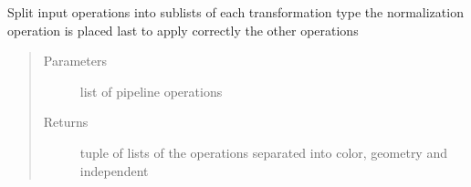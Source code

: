 \documentclass[letterpaper,10pt,english]{sphinxmanual}
\begin{document}

\begin{fulllineitems}
\label{\detokenize{ida_lib.core:ida_lib.core.pipeline_functional.split_operations_by_type}}
Split input operations into sub\sphinxhyphen{}lists of each transformation type
the normalization operation is placed last to apply correctly the other operations
\begin{quote}\begin{description}
\item[{Parameters}] \leavevmode
{} \textendash{} list of pipeline operations

\item[{Returns}] \leavevmode
tuple of lists of the operations separated into color, geometry and independent

\end{description}\end{quote}

\end{fulllineitems}

\end{document}
